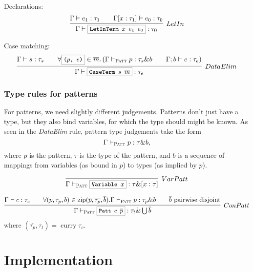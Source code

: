\documentclass[a4paper]{scrartcl}
\newcommand{\hsterm}[1]{%
    \setlength{\fboxsep}{3pt}%
    \setlength{\fboxrule}{0.2pt}%
    \fbox{\texttt{\small #1}}}
\renewcommand{\vec}[1]{\overline{#1}}
\DeclareMathOperator{\zip}{zip}
\DeclareMathOperator{\curry}{curry}
\begin{document}
Declarations:
\begin{align*}
\infer[LetIn]%
    {\Gamma \vdash \hsterm{LetInTerm \ensuremath{x} \ensuremath{e_1} \ensuremath{e_0}} : \tau_0}%
    {\Gamma \vdash e_1 : \tau_1 \qquad \Gamma [x : \tau_1] \vdash e_0 : \tau_0}
\end{align*}

Case matching:
\begin{align*}
\infer[DataElim]%
    {\Gamma \vdash \hsterm{CaseTerm \ensuremath{s} \ensuremath{\vec{m}}} : \tau_e}%
    {\Gamma \vdash s : \tau_s
    \qquad
    \forall \hsterm{(\ensuremath{p}, \ensuremath{e})} \in \vec{m}.\left(
        \Gamma \vdash_\textsc{Patt} p : \tau_s \& b \qquad
        \Gamma; b \vdash e : \tau_e
    \right)}
\end{align*}

\subsubsection{Type rules for patterns}
For patterns, we need slightly different judgements. Patterns don't just have
a type, but they also bind variables, for which the type should might be known.
As seen in the \textit{DataElim} rule, pattern type judgements take the form
\begin{equation*}
    \Gamma \vdash_\textsc{Patt} p : \tau \& b,
\end{equation*}
where $p$ is the pattern, $\tau$ is the type of the pattern, and $b$ is
a sequence of mappings from variables (as bound in $p$) to types (as implied
by $p$).

\begin{equation*}
\infer[VarPatt]%
    {\Gamma \vdash_\textsc{Patt} \hsterm{Variable \ensuremath{x}} : \tau \& [x : \tau]}%
    {}
\end{equation*}

\begin{equation*}
\infer[ConPatt]%
    {\Gamma \vdash_\textsc{Patt} \hsterm{Patt \ensuremath{c} \ensuremath{\vec{p}}} : \tau_t \& \bigcup \vec{b}}%
    {\Gamma \vdash c : \tau_c
    \qquad \forall (p,\tau_p,b) \in \zip(\vec{p}, \vec{\tau_p}, \vec{b}).
        \Gamma \vdash_\textsc{Patt} p : \tau_p \& b
    \qquad \text{$\vec{b}$ pairwise disjoint}}
\end{equation*}
where $(\vec{\tau_p}, \tau_t) = \curry \tau_c$.

\section{Implementation}
\end{document}
